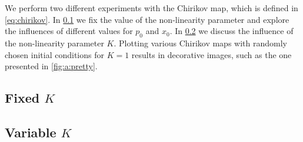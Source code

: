 
We perform two different experiments with the Chirikov map, which is defined in \cref{eq:chirikov}. In \cref{ss:fixed} we fix the value of the non-linearity parameter and explore the influences of different values for $p_0$ and $x_0$. In \cref{ss:variable} we discuss the influence of the non-linearity parameter $K$. Plotting various Chirikov maps with randomly chosen initial conditions for $K = 1$ results in decorative images, such as the one presented in \cref{fig:a:pretty}.

\subsection[]{Fixed $K$}
\label{ss:fixed}


\subsection[]{Variable $K$}
\label{ss:variable}
